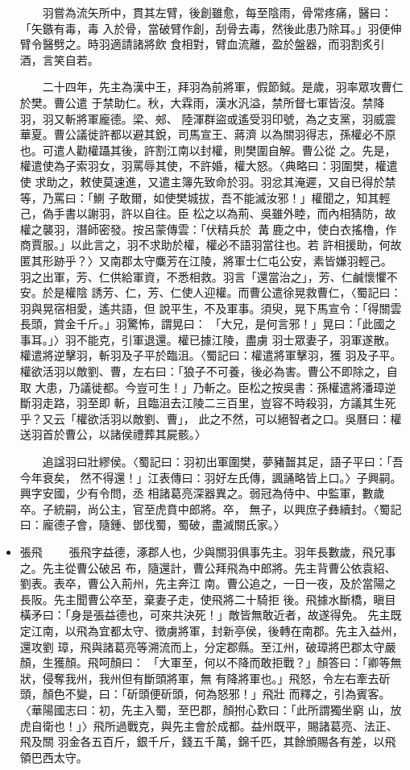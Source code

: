 \documentclass[11pt]{article}
\begin{document}
\begin{itemize}
　　羽嘗為流矢所中，貫其左臂，後創雖愈，每至陰雨，骨常疼痛，醫曰：「矢鏃有毒，毒
入於骨，當破臂作創，刮骨去毒，然後此患乃除耳。」羽便伸臂令醫劈之。時羽適請諸將飲
食相對，臂血流離，盈於盤器，而羽割炙引酒，言笑自若。

　　二十四年，先主為漢中王，拜羽為前將軍，假節鉞。是歲，羽率眾攻曹仁於樊。曹公遣
于禁助仁。秋，大霖雨，漢水汎溢，禁所督七軍皆沒。禁降羽，羽又斬將軍龐德。梁、郟、
陸渾群盜或遙受羽印號，為之支黨，羽威震華夏。曹公議徙許都以避其銳，司馬宣王、蔣濟
以為關羽得志，孫權必不原也。可遣人勸權躡其後，許割江南以封權，則樊圍自解。曹公從
之。先是，權遣使為子索羽女，羽罵辱其使，不許婚，權大怒。〈典略曰：羽圍樊，權遣使
求助之，敕使莫速進，又遣主簿先致命於羽。羽忿其淹遲，又自已得於禁等，乃罵曰：「鰂
子敢爾，如使樊城拔，吾不能滅汝邪！」權聞之，知其輕己，偽手書以謝羽，許以自往。臣
松之以為荊、吳雖外睦，而內相猜防，故權之襲羽，潛師密發。按呂蒙傳雲：「伏精兵於
冓鹿之中，使白衣搖櫓，作商賈服。」以此言之，羽不求助於權，權必不語羽當往也。若
許相援助，何故匿其形跡乎？〉又南郡太守麋芳在江陵，將軍士仁屯公安，素皆嫌羽輕己。
羽之出軍，芳、仁供給軍資，不悉相救。羽言「還當治之」，芳、仁鹹懷懼不安。於是權陰
誘芳、仁，芳、仁使人迎權。而曹公遣徐晃救曹仁，〈蜀記曰：羽與晃宿相愛，遙共語，但
說平生，不及軍事。須臾，晃下馬宣令：「得關雲長頭，賞金千斤。」羽驚怖，謂晃曰：
「大兄，是何言邪！」晃曰：「此國之事耳。」〉羽不能克，引軍退還。權已據江陵，盡虜
羽士眾妻子，羽軍遂散。權遣將逆擊羽，斬羽及子平於臨沮。〈蜀記曰：權遣將軍擊羽，獲
羽及子平。權欲活羽以敵劉、曹，左右曰：「狼子不可養，後必為害。曹公不即除之，自取
大患，乃議徙都。今豈可生！」乃斬之。臣松之按吳書：孫權遣將潘璋逆斷羽走路，羽至即
斬，且臨沮去江陵二三百里，豈容不時殺羽，方議其生死乎？又云「權欲活羽以敵劉、曹」，
此之不然，可以絕智者之口。吳曆曰：權送羽首於曹公，以諸侯禮葬其屍骸。〉

　　追諡羽曰壯繆侯。〈蜀記曰：羽初出軍圍樊，夢豬齧其足，語子平曰：「吾今年衰矣，
然不得還！」江表傳曰：羽好左氏傳，諷誦略皆上口。〉子興嗣。興字安國，少有令問，丞
相諸葛亮深器異之。弱冠為侍中、中監軍，數歲卒。子統嗣，尚公主，官至虎賁中郎將。卒，
無子，以興庶子彝續封。〈蜀記曰：龐德子會，隨鍾、鄧伐蜀，蜀破，盡滅關氏家。〉

\item 張飛
\label{sec:orgheadline211}
　　張飛字益德，涿郡人也，少與關羽俱事先主。羽年長數歲，飛兄事之。先主從曹公破呂
布，隨還計，曹公拜飛為中郎將。先主背曹公依袁紹、劉表。表卒，曹公入荊州，先主奔江
南。曹公追之，一日一夜，及於當陽之長阪。先主聞曹公卒至，棄妻子走，使飛將二十騎拒
後。飛據水斷橋，瞋目橫矛曰：「身是張益德也，可來共決死！」敵皆無敢近者，故遂得免。
先主既定江南，以飛為宜都太守、徵虜將軍，封新亭侯，後轉在南郡。先主入益州，還攻劉
璋，飛與諸葛亮等溯流而上，分定郡縣。至江州，破璋將巴郡太守嚴顏，生獲顏。飛呵顏曰：
「大軍至，何以不降而敢拒戰？」顏答曰：「卿等無狀，侵奪我州，我州但有斷頭將軍，無
有降將軍也。」飛怒，令左右牽去斫頭，顏色不變，曰：「斫頭便斫頭，何為怒邪！」飛壯
而釋之，引為賓客。〈華陽國志曰：初，先主入蜀，至巴郡，顏拊心歎曰：「此所謂獨坐窮
山，放虎自衛也！」〉飛所過戰克，與先主會於成都。益州既平，賜諸葛亮、法正、飛及關
羽金各五百斤，銀千斤，錢五千萬，錦千匹，其餘頒賜各有差，以飛領巴西太守。


\end{itemize}
\end{document}
